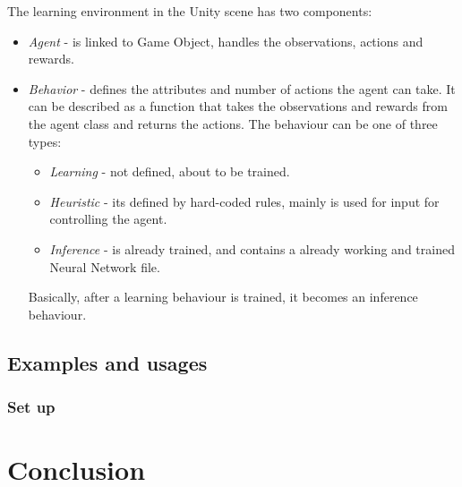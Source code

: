 \documentclass[a4paper, 12pt]{book}
\begin{document}
\clearpage

The learning environment in the Unity scene has two components:
\begin{itemize}
    \item \emph{Agent} - is linked to Game Object, handles the observations, actions and rewards.
    \item \emph{Behavior} - defines the attributes and number of actions the agent can take. It can be described as a function that takes the observations and rewards from the agent class and returns the actions. The behaviour can be one of three types:
    \begin{itemize}
        \item \emph{Learning} - not defined, about to be trained.
        \item \emph{Heuristic} - its defined by hard-coded rules, mainly is used for input for controlling the agent.
        \item \emph{Inference} - is already trained, and contains a already working and trained Neural Network file.
    \end{itemize}
    Basically, after a learning behaviour is trained, it becomes an inference behaviour.
\end{itemize}

\section{Examples and usages}

\subsection{Set up}

\chapter{Conclusion}
\label{ch4}



\cleardoublepage
{}


\end{document}
